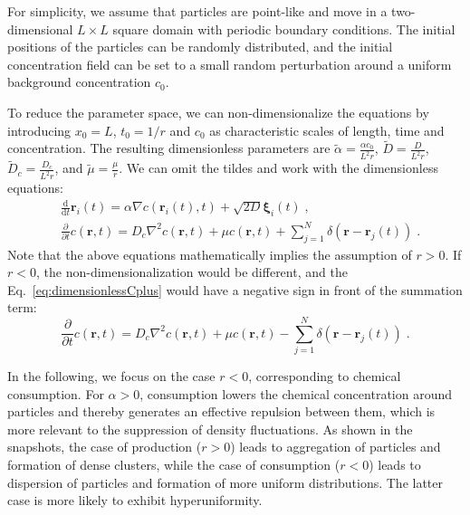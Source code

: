 \documentclass{article}
\begin{document}
For simplicity, we assume that particles are point-like and move in a two-dimensional $L \times L$ square domain with periodic boundary conditions. The initial positions of the particles can be randomly distributed, and the initial concentration field can be set to a small random perturbation around a uniform background concentration $c_0$.

To reduce the parameter space, we can non-dimensionalize the equations by introducing $x_0 = L$, $t_0 = 1/r$ and $c_0$ as characteristic scales of length, time and concentration. The resulting dimensionless parameters are $\tilde{\alpha} = \frac{\alpha c_0}{L^2 r}$, $\tilde{D} = \frac{D}{L^2 r}$, $\tilde{D}_c = \frac{D_c}{L^2 r}$, and $\tilde{\mu} = \frac{\mu}{r}$. We can omit the tildes and work with the dimensionless equations:
\begin{subequations}
    \begin{align}
        &\frac{\mathrm{d}}{\mathrm{d}t}\mathbf{r}_i\left( t \right) =\alpha \nabla c\left( \mathbf{r}_i\left( t \right) ,t \right) +\sqrt{2D}\boldsymbol{\xi }_i\left( t \right) \;,\\
        &\frac{\partial}{\partial t} c \left( \mathbf{r},t \right) =D_c\nabla ^2c\left( \mathbf{r},t \right) +\mu c\left( \mathbf{r},t \right) +\sum_{j=1}^{N}{\delta \left( \mathbf{r}-\mathbf{r}_j\left( t \right) \right)}\;.\label{eq:dimensionlessCplus}
    \end{align}
\end{subequations}
Note that the above equations mathematically implies the assumption of $r>0$. If $r<0$, the non-dimensionalization would be different, and the Eq.~\eqref{eq:dimensionlessCplus} would have a negative sign in front of the summation term:
\begin{equation}
    \frac{\partial}{\partial t} c\left( \mathbf{r},t \right) =D_c\nabla ^2c\left( \mathbf{r},t \right) +\mu c\left( \mathbf{r},t \right) -\sum_{j=1}^{N}{\delta \left( \mathbf{r}-\mathbf{r}_j\left( t \right) \right)}\;.
\end{equation}

In the following, we focus on the case $r<0$, corresponding to chemical consumption. For $\alpha>0$, consumption lowers the chemical concentration around particles and thereby generates an effective repulsion between them, which is more relevant to the suppression of density fluctuations.
As shown in the snapshots, the case of production ($r>0$) leads to aggregation of particles and formation of dense clusters, while the case of consumption ($r<0$) leads to dispersion of particles and formation of more uniform distributions. The latter case is more likely to exhibit hyperuniformity.
\end{document}
